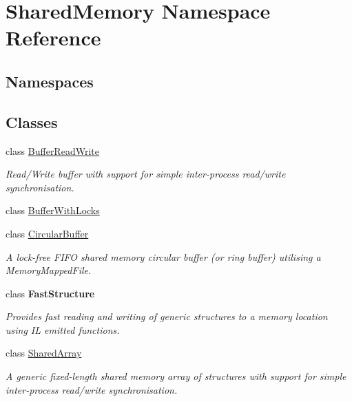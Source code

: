 \hypertarget{namespace_shared_memory}{}\section{Shared\+Memory Namespace Reference}
\label{namespace_shared_memory}
\subsection*{Namespaces}
\begin{DoxyCompactItemize}
\end{DoxyCompactItemize}
\subsection*{Classes}
\begin{DoxyCompactItemize}
\item 
class \hyperlink{class_shared_memory_1_1_buffer_read_write}{Buffer\+Read\+Write}
\begin{DoxyCompactList}\small\item\em Read/\+Write buffer with support for simple inter-\/process read/write synchronisation. \end{DoxyCompactList}\item 
class \hyperlink{class_shared_memory_1_1_buffer_with_locks}{Buffer\+With\+Locks}
\item 
class \hyperlink{class_shared_memory_1_1_circular_buffer}{Circular\+Buffer}
\begin{DoxyCompactList}\small\item\em A lock-\/free F\+I\+FO shared memory circular buffer (or ring buffer) utilising a Memory\+Mapped\+File. \end{DoxyCompactList}\item 
class {\bfseries Fast\+Structure}
\begin{DoxyCompactList}\small\item\em Provides fast reading and writing of generic structures to a memory location using IL emitted functions. \end{DoxyCompactList}\item 
class \hyperlink{class_shared_memory_1_1_shared_array}{Shared\+Array}
\begin{DoxyCompactList}\small\item\em A generic fixed-\/length shared memory array of structures with support for simple inter-\/process read/write synchronisation. \end{DoxyCompactList}\item 

\end{DoxyCompactItemize}
